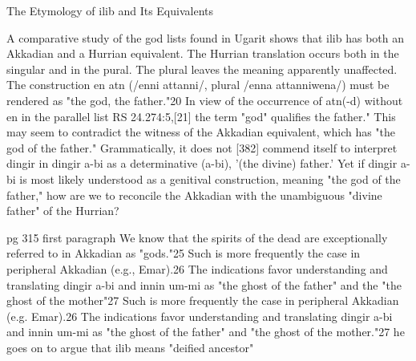 \documentclass[11pt]{article}
\begin{document}
{The Etymology of ilib and Its Equivalents

A comparative study of the god lists found in Ugarit shows that ilib has both an Akkadian and a Hurrian equivalent. The Hurrian translation occurs both in the singular and in the pural. The plural leaves the meaning apparently unaffected. The construction en atn (/enni attanni/, plural /enna attanniwena/) must be rendered as "the god, the father."20 In view of the occurrence of atn(-d) without en in the parallel list RS 24.274:5,[21] the term "god" qualifies the father." This may seem to contradict the witness of the Akkadian equivalent, which has "the god of the father." Grammatically, it does not [382] commend itself to interpret dingir in dingir a-bi as a determinative (a-bi), '(the divine) father.' Yet if dingir a-bi is most likely understood as a genitival construction, meaning "the god of the father," how are we to reconcile the Akkadian with the unambiguous "divine father" of the Hurrian?

pg 315 first paragraph
We know that the spirits of the dead are exceptionally referred to in Akkadian as "gods."25 Such is more frequently the case in peripheral Akkadian (e.g., Emar).26 The indications favor understanding and translating dingir a-bi and innin um-mi as "the ghost of the father" and the "the ghost of the mother"27
 Such is more frequently the case in peripheral Akkadian (e.g. Emar).26 The indications favor understanding and translating dingir a-bi and innin um-mi as "the ghost of the father" and "the ghost of the mother."27
he goes on to argue that ilib means "deified ancestor"


}
\end{document}

